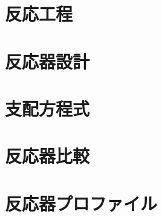 \documentclass[11pt,aspectratio=43,dvipsnames]{beamer}
\begin{document}
\setcounter{framenumber}{3}
\section{反応工程}
\section{反応器設計}
\section{支配方程式}
\section{反応器比較}
\section{反応器プロファイル}
\end{document}
